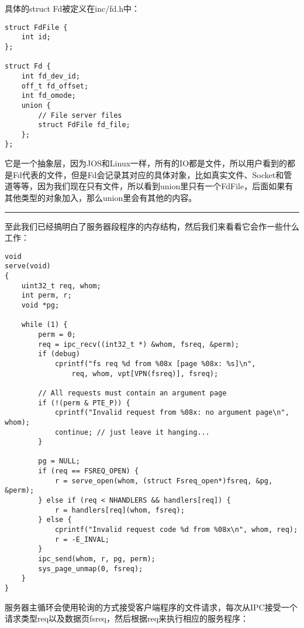 \documentclass{article}
\begin{document}
\begin{CJK*}{UTF8}{gkai}
具体的struct Fd被定义在inc/fd.h中：

\newpage

\begin{lstlisting}[style=ccode, firstnumber=26, title={\scriptsize \ttfamily \bfseries inc/fd.h}]
struct FdFile {
	int id;
};
 
struct Fd {
	int fd_dev_id;
	off_t fd_offset;
	int fd_omode;
	union {
		// File server files
		struct FdFile fd_file;
	};
};
\end{lstlisting}

它是一个抽象层，因为JOS和Linux一样，所有的IO都是文件，所以用户看到的都是Fd代表的文件，但是Fd会记录其对应的具体对象，比如真实文件、Socket和管道等等，因为我们现在只有文件，所以看到union里只有一个FdFile，后面如果有其他类型的对象加入，那么union里会有其他的内容。

\vspace{2em}
\hrule
\vspace{2em}

至此我们已经搞明白了服务器段程序的内存结构，然后我们来看看它会作一些什么工作：


\begin{lstlisting}[style=ccode, title={\scriptsize \ttfamily \bfseries fs/serv.c: serve()}]
void
serve(void)
{
    uint32_t req, whom;
    int perm, r;
    void *pg;

    while (1) {
        perm = 0;
        req = ipc_recv((int32_t *) &whom, fsreq, &perm);
        if (debug)
            cprintf("fs req %d from %08x [page %08x: %s]\n",
                req, whom, vpt[VPN(fsreq)], fsreq);

        // All requests must contain an argument page
        if (!(perm & PTE_P)) {
            cprintf("Invalid request from %08x: no argument page\n", whom);
            continue; // just leave it hanging...
        }

        pg = NULL;
        if (req == FSREQ_OPEN) {
            r = serve_open(whom, (struct Fsreq_open*)fsreq, &pg, &perm);
        } else if (req < NHANDLERS && handlers[req]) {
            r = handlers[req](whom, fsreq);
        } else {
            cprintf("Invalid request code %d from %08x\n", whom, req);
            r = -E_INVAL;
        }
        ipc_send(whom, r, pg, perm);
        sys_page_unmap(0, fsreq);
    }
}
\end{lstlisting}

服务器主循环会使用轮询的方式接受客户端程序的文件请求，每次从IPC接受一个请求类型req以及数据页fsreq，然后根据req来执行相应的服务程序：


\end{CJK*}
\end{document}
